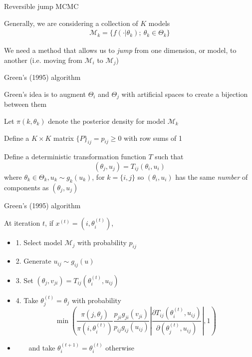 \documentclass[mathserif, 12pt, t]{beamer}
\renewcommand{\frametitle}[1]{\vspace{0.14cm}\hspace{-0.70cm}\textcolor{col2}{%
    \Large{#1}}\vspace{0.15cm}\newline}
\begin{document}
\begin{frame}
\frametitle{Reversible jump MCMC}

Generally, we are considering a collection of $K$ models
\begin{align*}
\mathcal{M}_k=\{f(\cdot|\theta_k);~\theta_k\in\Theta_k\} 
\end{align*}

We need a method that allows us to \emph{jump} from one dimension, or model, to another (i.e. moving from $\mathcal{M}_i$ to $\mathcal{M}_j$)

\end{frame}

\begin{frame}
\frametitle{Green's (1995) algorithm}

Green's idea is to augment $\Theta_i$ and $\Theta_j$ with artificial spaces to create a bijection between them
\bigskip

Let $\pi(k, \theta_k)$ denote the posterior density for model $\mathcal{M}_k$
\bigskip

Define a $K\times K$ matrix $\{P\}_{ij} = p_{ij}\geq 0$ with row sums of 1
\bigskip

Define a deterministic transformation function $T$ such that
\[(\theta_j,u_j) = T_{ij}(\theta_i,u_i)\]
where $\theta_k\in\Theta_k, u_k\sim g_k(u_k)$, for $k=\{i,j\}$ so $(\theta_i,u_i)$ has the same \emph{number} of components as $(\theta_j,u_j)$

\end{frame}

\begin{frame}
\frametitle{Green's (1995) algorithm}

At iteration $t$, if $x^{(t)}=(i,\theta_i^{(t)})$,
\begin{itemize}
\item 1. Select model $\mathcal{M}_j$ with probability $p_{ij}$
\item 2. Generate $u_{ij}\sim g_{ij}(u)$
\item 3. Set $(\theta_j, v_{ji})=T_{ij}(\theta_i^{(t)},u_{ij})$
\item 4. Take $\theta_j^{(t)}=\theta_j$ with probability
\[ \min\left(\frac{\pi(j,\theta_j)}{\pi(i,\theta_i^{(t)})}\frac{p_{ji}g_{ji}(v_{ji})}{p_{ij}g_{ij}(u_{ij})}\left|\frac{\partial T_{ij}(\theta_i^{(t)},u_{ij})}{\partial(\theta_j^{(t)},u_{ij})}\right|,1\right) \]
\item ~~~ and take $\theta_i^{(t+1)}=\theta_i^{(t)}$ otherwise
\end{itemize}

\end{frame}
\end{document}
